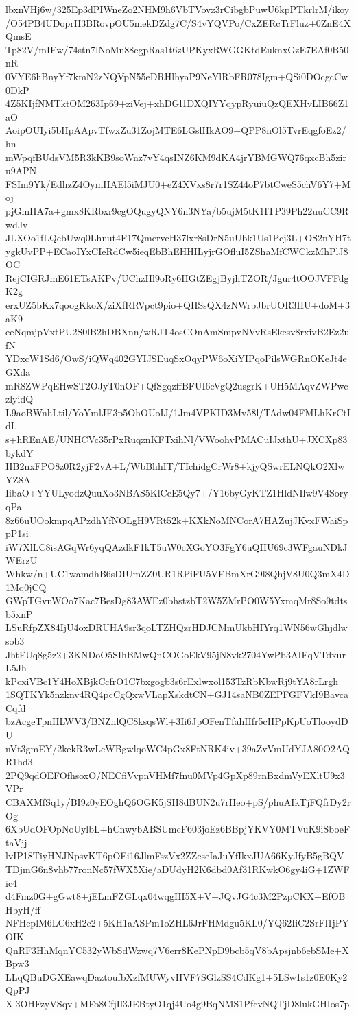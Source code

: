 lbxnVHj6w/325Ep3dPIWneZo2NHM9h6VbTVovz3rCibgbPuwU6kpPTkrlrM/ikoy
/O54PB4UDoprH3BRovpOU5mekDZdg7C/S4vYQVPo/CxZERcTrFluz+0ZnE4XQmsE
Tp82V/mIEw/74stn7lNoMn88cgpRas1t6zUPKyxRWGGKtdEuknxGzE7EAf0B50nR
0VYE6hBnyYf7kmN2zNQVpN55eDRHlhyaP9NeYlRbFR078Igm+QSi0DOcgcCw0DkP
4Z5KIjfNMTktOM263Ip69+ziVej+xhDGl1DXQIYYqypRyuiuQzQEXHvLIB66Z1aO
AoipOUIyi5bHpAApvTfwxZu31ZojMTE6LGslHkAO9+QPP8nOl5TvrEqgfoEz2/hn
mWpqfBUdsVM5R3kKB9soWnz7vY4qsINZ6KM9dKA4jrYBMGWQ76qxcBh5ziru9APN
FSIm9Yk/EdhzZ4OymHAEl5iMJU0+eZ4XVxs8r7r1SZ44oP7btCweS5chV6Y7+Moj
pjGmHA7a+gmx8KRbxr9cgOQugyQNY6n3NYa/b5ujM5tK1ITP39Ph22uuCC9RwdJv
JLXOo1fLQcbUwq0Lhnut4F17QmerveH37lxr8sDrN5uUbk1Us1Pcj3L+OS2nYH7t
ygkUvPP+ECaoIYxCIeRdCw5ieqEbBhEHHILyjrGOfluI5ZShaMfCWCkzMhPlJ8OC
RejCIGRJmE61ETsAKPv/UChzHl9oRy6HGtZEgjByjhTZOR/Jgur4tOOJVFFdgK2g
erxUZ5bKx7qoogKkoX/ziXfRRVpct9pio+QHSsQX4zNWrbJbrUOR3HU+doM+3aK9
eeNqmjpVxtPU2S0lB2hDBXnn/wRJT4osCOnAmSmpvNVvRsEkesv8rxivB2Ez2ufN
YDxcW1Sd6/OwS/iQWq402GYIJSEuqSxOqyPW6oXiYIPqoPilsWGRnOKeJt4eGXda
mR8ZWPqEHwST2OJyT0nOF+QfSgqzffBFUI6eVgQ2usgrK+UH5MAqvZWPwczlyidQ
L9aoBWnhLtil/YoYmlJE3p5OhOUoIJ/1Jm4VPKID3Mv58l/TAdw04FMLhKrCtIdL
s+hREnAE/UNHCVc35rPxRuqznKFTxihNl/VWoohvPMACuIJxthU+JXCXp83bykdY
HB2nxFPO8z0R2yjF2vA+L/WbBhhIT/TIchidgCrWr8+kjyQSwrELNQkO2XlwYZ8A
IibaO+YYULyodzQuuXo3NBAS5KlCeE5Qy7+/Y16byGyKTZ1HldNIlw9V4SoryqPa
8z66uUOokmpqAPzdhYfNOLgH9VRt52k+KXkNoMNCorA7HAZujJKvxFWaiSppP1si
iW7XlLC8isAGqWr6yqQAzdkF1kT5uW0cXGoYO3FgY6uQHU69c3WFgauNDkJWErzU
Whkw/n+UC1wamdhB6sDIUmZZ0UR1RPiFU5VFBmXrG9l8QhjV8U0Q3mX4D1Mq0jCQ
GWpTGvnWOo7Kac7BesDg83AWEz0bhstzbT2W5ZMrPO0W5YxmqMr8So9tdtsb5xnP
LSuRfpZX84IjU4oxDRUHA9sr3qoLTZHQzrHDJCMmUkbHIYrq1WN56wGhjdlwsob3
JhtFUq8g5z2+3KNDoO5SIhBMwQnCOGoEkV95jN8vk2704YwPb3AIFqVTdxurL5Jh
kPcxiVBc1Y4HoXBjkCcfrO1C7bxgogb3s6rExlwxol153TzRbKbwRj9tYA8rLrgh
1SQTKYk5nzknv4RQ4pcCgQxwVLapXskdtCN+GJ14saNB0ZEPFGFVkI9BavcaCqfd
bzAcgeTpnHLWV3/BNZnlQC8ksqsWl+3Ii6JpOFenTfahHfr5cHPpKpUoTlooydDU
nVt3gmEY/2kekR3wLcWBgwlqoWC4pGx8FtNRK4iv+39aZvVmUdYJA80O2AQR1hd3
2PQ9qdOEFOfhsoxO/NECfiVvpnVHMf7fnu0MVp4GpXp89rnBxdmVyEXltU9x3VPr
CBAXMfSq1y/BI9z0yEOghQ6OGK5jSH8dBUN2u7rHeo+pS/phuAIkTjFQfrDy2rOg
6XbUdOFOpNoUylbL+hCnwybABSUmcF603joEz6BBpjYKVY0MTVuK9iSboeFtaVjj
lvIP18TiyHNJNpsvKT6pOEi16JlmFszVx2ZZcseIaJuYfIkxJUA66KyJfyB5gBQV
TDjmG6n8vhb77ronNc57fWX5Xie/aDUdyH2K6dbd0Af31RKwkO6gy4iG+1ZWFic4
d4Fmz0G+gGwt8+jELmFZGLqx04wqgHI5X+V+JQvJG4c3M2PzpCKX+EfOBHbyH/ff
NFHeplM6LC6xH2c2+5KH1aASPm1oZHL6JrFHMdgu5KL0/YQ62IiC2SrFl1jPYOIK
QnRF3HhMqnYC532yWbSdWzwq7V6err8KePNpD9bcb5qV8bApsjnb6ebSMe+XBpw3
LLqQBuDGXEawqDaztoufbXzfMUWyvHVF7SGlzSS4CdKg1+5LSw1s1z0E0Ky2QpPJ
Xl3OHFzyVSqv+MFo8CfjIl3JEBtyO1qj4Uo4g9BqNMS1PfcvNQTjD8lukGHIos7p
